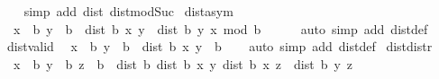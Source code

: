 \begin{isabellebody}
%
\isadelimproof
\ \ %
\endisadelimproof
%
\isatagproof
{}\isamarkupfalse%
\ {\isacharparenleft}{\kern0pt}simp\ add{\isacharcolon}{\kern0pt}\ dist{}{\isacharunderscore}{\kern0pt}{}\ dist{}{\isacharunderscore}{\kern0pt}mod{\isacharunderscore}{\kern0pt}Suc{\isacharparenright}{\kern0pt}%
\endisatagproof
{\isafoldproof}%
%
\isadelimproof
\isanewline
%
\endisadelimproof
\isanewline
{}\isamarkupfalse%
\ dist{}{\isacharunderscore}{\kern0pt}asym{\isacharcolon}{\kern0pt}\isanewline
\ \ {\isachardoublequoteopen}{\isasymlbrakk}x\ {\isacharless}{\kern0pt}\ b{\isacharsemicolon}{\kern0pt}\ y\ {\isacharless}{\kern0pt}\ b{\isasymrbrakk}\ {\isasymLongrightarrow}\ {\isacharparenleft}{\kern0pt}dist{}\ b\ x\ y\ {\isacharplus}{\kern0pt}\ dist{}\ b\ y\ x{\isacharparenright}{\kern0pt}\ mod\ b\ {\isacharequal}{\kern0pt}\ {}{\isachardoublequoteclose}\isanewline
%
\isadelimproof
\ \ %
\endisadelimproof
%
\isatagproof
{}\isamarkupfalse%
\ {\isacharparenleft}{\kern0pt}auto\ simp\ add{\isacharcolon}{\kern0pt}\ dist{}{\isacharunderscore}{\kern0pt}def{\isacharparenright}{\kern0pt}%
\endisatagproof
{\isafoldproof}%
%
\isadelimproof
\isanewline
%
\endisadelimproof
\isanewline
{}\isamarkupfalse%
\ dist{}{\isacharunderscore}{\kern0pt}valid{\isacharcolon}{\kern0pt}\isanewline
\ \ {\isachardoublequoteopen}{\isasymlbrakk}x\ {\isacharless}{\kern0pt}\ b{\isacharsemicolon}{\kern0pt}\ y\ {\isacharless}{\kern0pt}\ b{\isasymrbrakk}\ {\isasymLongrightarrow}\ dist{}\ b\ x\ y\ {\isacharless}{\kern0pt}\ b{\isachardoublequoteclose}\isanewline
%
\isadelimproof
\ \ %
\endisadelimproof
%
\isatagproof
{}\isamarkupfalse%
\ {\isacharparenleft}{\kern0pt}auto\ simp\ add{\isacharcolon}{\kern0pt}\ dist{}{\isacharunderscore}{\kern0pt}def{\isacharparenright}{\kern0pt}%
\endisatagproof
{\isafoldproof}%
%
\isadelimproof
\isanewline
%
\endisadelimproof
\isanewline
\isanewline
{}\isamarkupfalse%
\ dist{}{\isacharunderscore}{\kern0pt}distr{\isacharcolon}{\kern0pt}\isanewline
\ \ {\isachardoublequoteopen}{\isasymlbrakk}x\ {\isacharless}{\kern0pt}\ b{\isacharsemicolon}{\kern0pt}\ y\ {\isacharless}{\kern0pt}\ b{\isacharsemicolon}{\kern0pt}\ z\ {\isacharless}{\kern0pt}\ b{\isasymrbrakk}\ {\isasymLongrightarrow}\ dist{}\ b\ {\isacharparenleft}{\kern0pt}dist{}\ b\ x\ y{\isacharparenright}{\kern0pt}\ {\isacharparenleft}{\kern0pt}dist{}\ b\ x\ z{\isacharparenright}{\kern0pt}\ {\isacharequal}{\kern0pt}\ dist{}\ b\ y\ z{\isachardoublequoteclose}\isanewline

\end{isabellebody}
